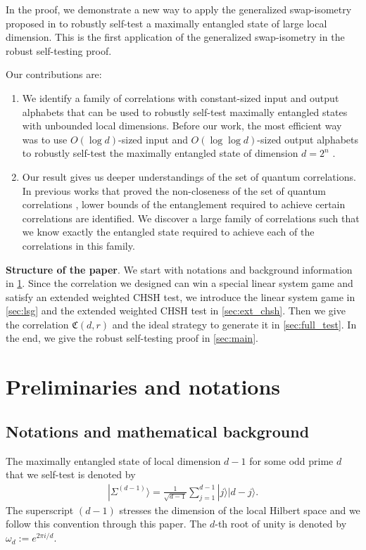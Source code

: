 \documentclass[11pt,letterpaper]{article}
\newcommand{\ket}[1]{|#1\rangle}
\newcommand{\1}{\mathbb{1}}
\newcommand{\EPR}[1]{\Sigma^{(#1)}}
\newcommand{\fC}{\mathfrak{C}}
\theoremstyle{definition}
\begin{document}
In the proof, we demonstrate a new way to apply the generalized swap-isometry
proposed in \cite{yang2013} to robustly self-test a maximally entangled state of large local
dimension. This is the first application of the generalized swap-isometry in the robust self-testing proof.


Our contributions are:
\begin{enumerate}
\item We identify a family of correlations with constant-sized input and output alphabets that can be used to robustly self-test
maximally entangled states with unbounded local dimensions. Before our work, the most efficient way 
was to use $O(\log d)$-sized input and $O(\log \log d)$-sized output alphabets to robustly self-test
the maximally entangled state of dimension $d = 2^n$ \cite{lowdegree}.



\item Our result gives us deeper understandings of the set of quantum correlations.
In previous works that proved the non-closeness of the set of quantum correlations \cite{slofstra2017, slofstra2018}, 
lower bounds of the entanglement required to achieve certain correlations are identified.
We discover a large family of correlations such that we know exactly the entangled state
required to achieve each of the correlations in this family. 
\end{enumerate}

\textbf{Structure of the paper}.
We start with notations and background information in \cref{sec:prelim}.
Since the correlation we designed can win a special linear system game and satisfy
an extended weighted CHSH test, we introduce the linear system game
in \cref{sec:lsg} and the extended weighted CHSH test in \cref{sec:ext_chsh}. 
Then we give the correlation $\fC(d,r)$ and the ideal strategy to generate it in \cref{sec:full_test}.
In the end, we give the robust self-testing proof in \cref{sec:main}. 

\section{Preliminaries and notations}
\label{sec:prelim}
\subsection{Notations and mathematical background}
The maximally entangled state of local dimension $d-1$ for some odd prime $d$ that we self-test is denoted by
\begin{align}
\ket{\EPR{d-1}} = \frac{1}{\sqrt{d-1}} \sum_{j = 1}^{d-1} \ket{j}\ket{d-j}.
\end{align}
The superscript $(d-1)$ stresses the dimension of the local Hilbert space and we follow this convention through this paper.
The $d$-th root of unity is denoted by $\omega_d:=e^{2\pi i/d}$. 
\end{document}
